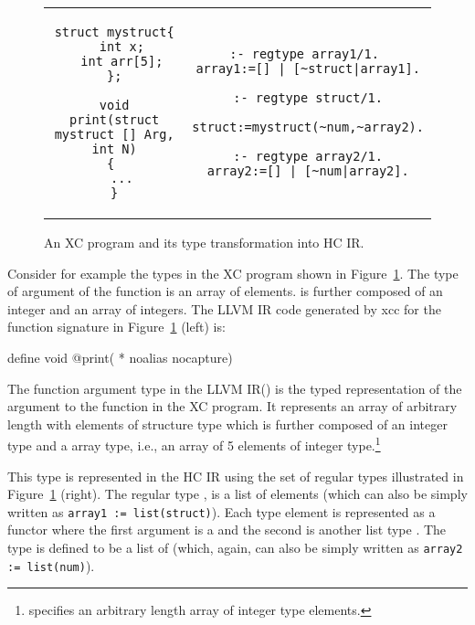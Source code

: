 \documentclass{llncs}
\newcommand{\hcir}{HC IR\xspace}
\newcommand{\llvmir}{LLVM IR\xspace}
\newcommand{\figend}{\vspace*{-5mm}}
\begin{document}
\begin{figure}[ht]

\begin{tabular}{  c | c  }
\begin{lstlisting}[language=xc]
struct mystruct{
  int x;
  int arr[5];
};

void print(struct mystruct [] Arg, int N)
{ 
  ...
}
\end{lstlisting}

&

\begin{lstlisting}[language=ciao]
:- regtype array1/1. 
array1:=[] | [~struct|array1].

:- regtype struct/1.

struct:=mystruct(~num,~array2).

:- regtype array2/1.
array2:=[] | [~num|array2].
\end{lstlisting}
\end{tabular}

\caption{An XC program and its type transformation into \hcir.}
\label{xc2regtypes}
\figend
\end{figure}



Consider for example the types in the XC program shown in
Figure~\ref{xc2regtypes}.  The type of argument  of the 
function is an array of  elements.  is further
composed of an integer and an array of integers.  The \llvmir
code generated by xcc for the function signature  in Figure~\ref{xc2regtypes} (left) is:
\vspace{-1mm}
\begin{center}
define void @print( * noalias nocapture)
\end{center}
\vspace{-1mm}
The function argument type in the \llvmir () is the typed representation of the argument  to
the function in the XC program. It represents an array of arbitrary length with 
 elements of  structure type which is further
composed of an  integer type and a  array type,
i.e., an array of 5 elements of  integer type.\footnote{ specifies an arbitrary length array of  integer type elements. }

This type is represented in the \hcir using the set of regular types
illustrated in Figure~\ref{xc2regtypes} (right). The regular type ,
is a list of  elements (which can also be simply written as
\texttt{array1 := list(struct)}). Each  type element is
represented as a functor  where the first argument is a
 and the second is another list type .  The type 
is defined to be a list of  (which, again, can also be simply
written as \texttt{array2 := list(num)}).
\end{document}
